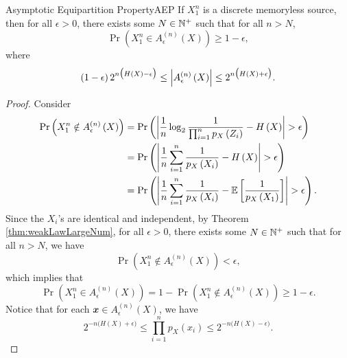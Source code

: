 \documentclass[math, code]{amznotes}
\theoremstyle{remark}
\begin{document}
\begin{thmbox}{Asymptotic Equipartition Property}{AEP}
    If $X_1^n$ is a discrete memoryless source, then for all $\epsilon > 0$, there exists some $N \in \mathbb{N}^+$ such that for all $n > N$, 
    \begin{equation*}
        \Pr\left(X_1^n \in A_{\epsilon}^{\left(n\right)}\left(X\right)\right) \geq 1 - \epsilon,
    \end{equation*}
    where 
    \begin{equation*}
        \left(1 - \epsilon\right)2^{n\bigl(H\left(X\right) - \epsilon\bigr)} \leq {\left\lvert {A_{\epsilon}^{\left(n\right)}\left(X\right)} \right\rvert} \leq 2^{n\bigl(H\left(X\right) + \epsilon\bigr)}.
    \end{equation*}
    \tcblower
    \begin{proof}
        Consider 
        \begin{align*}
            \Pr\left(X_1^n \notin A_{\epsilon}^{\left(n\right)}\left(X\right)\right) & = \Pr\left({\left\lvert {\frac{1}{n}\log_2\frac{1}{\prod_{i = 1}^np_X\left(Z_i\right)} - H\left(X\right)} \right\rvert} > \epsilon\right) \\
            & = \Pr\left({\left\lvert {\frac{1}{n}\sum_{i = 1}^{n}\frac{1}{p_X\left(X_i\right)} - H\left(X\right)} \right\rvert} > \epsilon\right) \\
            & = \Pr\left({\left\lvert {\frac{1}{n}\sum_{i = 1}^{n}\frac{1}{p_X\left(X_i\right)} - \mathbb{E}\left[\frac{1}{p_X\left(X_1\right)}\right]} \right\rvert} > \epsilon\right).
        \end{align*}
        Since the $X_i$'s are identical and independent, by Theorem \ref{thm:weakLawLargeNum}, for all $\epsilon > 0$, there exists some $N \in \mathbb{N}^+$ such that for all $n > N$, we have
        \begin{equation*}
            \Pr\left(X_1^n \notin A_{\epsilon}^{\left(n\right)}\left(X\right)\right) < \epsilon,
        \end{equation*}
        which implies that 
        \begin{equation*}
            \Pr\left(X_1^n \in A_{\epsilon}^{\left(n\right)}\left(X\right)\right) = 1 - \Pr\left(X_1^n \notin A_{\epsilon}^{\left(n\right)}\left(X\right)\right) \geq 1 - \epsilon.
        \end{equation*}
        Notice that for each $\mathbfit{x} \in A_{\epsilon}^{\left(n\right)}\left(X\right)$, we have 
        \begin{equation*}
            2^{-n\bigl(H\left(X\right) + \epsilon\bigr)} \leq \prod_{i = 1}^np_X\left(x_i\right) \leq 2^{-n\bigl(H\left(X\right) - \epsilon\bigr)}.

\end{equation*}
\end{proof}
\end{thmbox}
\end{document}
